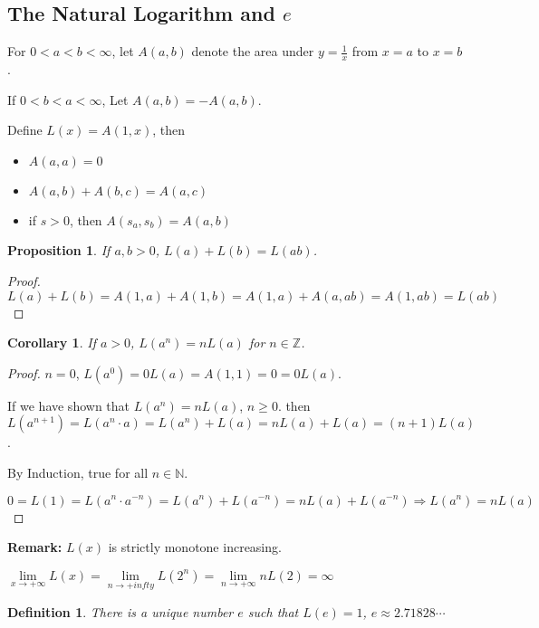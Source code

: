 \documentclass[12pt]{article}
\theoremstyle{plain}
\newtheorem{definition}{Definition}[subsection]
\newtheorem{proposition}{Proposition}[subsection]
\newtheorem{corollary}{Corollary}[subsection]
\newcommand{\dlim}{\displaystyle\lim\limits}
\begin{document}
    \subsection{The Natural Logarithm and $e$}
    For $0<a<b<\infty$, let $A(a,b)$ denote
    the area under $y=\frac1x$ from $x=a$ to $x=b$.
    
    If $0<b<a<\infty$, Let $A(a,b)=-A(a,b)$.

    Define $L(x) = A(1, x)$, then 
    \begin{itemize}
        \item $A(a,a)=0$
        \item $A(a,b)+A(b,c) = A(a,c)$
        \item if $s>0$, then $A(s_a, s_b)=A(a,b)$\\
    \end{itemize}

    \begin{proposition}
        If $a, b>0$, $L(a) + L(b)=L(ab)$.
    \end{proposition}
    \begin{proof}
        $L(a)+L(b)=A(1,a)+A(1,b)=A(1,a)+A(a,ab)=A(1,ab)=L(ab)$\\
    \end{proof}

    \begin{corollary}
        If $a>0$, $L(a^n) = nL(a)$ for $n \in \mathbb{Z}$.
    \end{corollary}
    \begin{proof}
        $n=0$, $L(a^0) = 0L(a)=A(1,1)=0=0L(a)$.
        
        If we have shown that $L(a^n) = nL(a)$, $n\geq 0$.
        then $L(a^{n+1})=L(a^n\cdot a)=L(a^n)+L(a) =nL(a)+L(a)=(n+1)L(a)$.

        By Induction, true for all $n \in \mathbb{N}$.

        $0=L(1)=L(a^n\cdot a^{-n})=L(a^n)+L(a^{-n})=nL(a)+L(a^{-n})
        \Rightarrow L(a^n)=nL(a)$\\
    \end{proof}

    \textbf{Remark:} $L(x)$ is strictly monotone increasing. 

    $\dlim_{x\to+\infty} L(x) = \dlim_{n\to+infty} L(2^n)
    =\dlim_{n\to+\infty} nL(2)=\infty$\\

    \begin{definition}
        There is a unique number $e$ such that $L(e) = 1$, $e\approx 2.71828\cdots$
    \end{definition}
    
\end{document}
